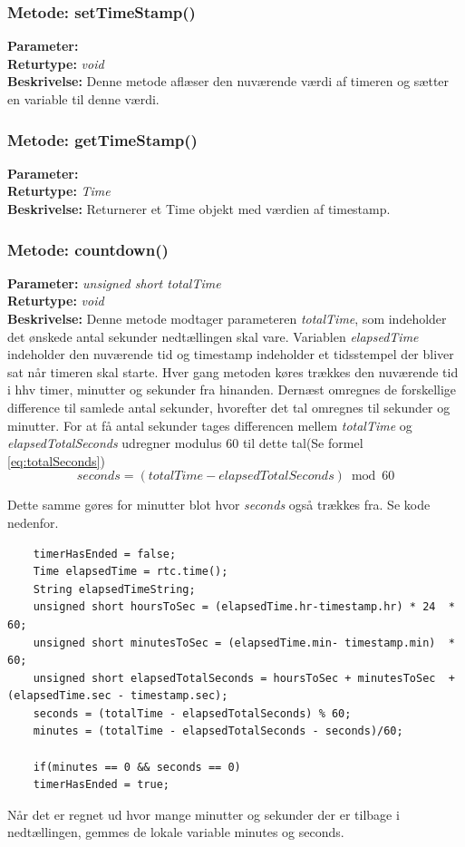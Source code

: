 \subsubsection{Metode: setTimeStamp()}
\textbf{Parameter: } 
\\ \textbf{Returtype: } \textit{void}
\\ \textbf{Beskrivelse: } Denne metode aflæser den nuværende værdi af timeren og sætter en variable til denne værdi. 

\subsubsection{Metode: getTimeStamp()}
\textbf{Parameter: } 
\\ \textbf{Returtype: } \textit{Time}
\\ \textbf{Beskrivelse: } Returnerer et Time objekt med værdien af timestamp. 

\subsubsection{Metode: countdown()}
\textbf{Parameter: } \textit{unsigned short totalTime}
\\ \textbf{Returtype: } \textit{void}
\\ \textbf{Beskrivelse: } Denne metode modtager parameteren \textit{totalTime}, som indeholder det ønskede antal sekunder nedtællingen skal vare. Variablen \textit{elapsedTime} indeholder den nuværende tid og timestamp indeholder et tidsstempel der bliver sat når timeren skal starte. Hver gang metoden køres trækkes den nuværende tid i hhv timer, minutter og sekunder fra hinanden. Dernæst omregnes de forskellige difference til samlede antal sekunder, hvorefter det tal omregnes til sekunder og minutter. For at få antal sekunder tages differencen mellem \textit{totalTime} og \textit{elapsedTotalSeconds} udregner modulus 60 til dette tal(Se formel \ref{eq:totalSeconds})
\begin{equation} \label{eq:totalSeconds}
seconds = (totalTime - elapsedTotalSeconds) \bmod 60
\end{equation}

Dette samme gøres for minutter blot hvor \textit{seconds} også trækkes fra. Se kode nedenfor. 
\begin{lstlisting}
	timerHasEnded = false;
	Time elapsedTime = rtc.time();
	String elapsedTimeString;
	unsigned short hoursToSec = (elapsedTime.hr-timestamp.hr) * 24	* 60;
	unsigned short minutesToSec = (elapsedTime.min- timestamp.min)	* 60;
	unsigned short elapsedTotalSeconds = hoursToSec + minutesToSec	+ (elapsedTime.sec - timestamp.sec);
	seconds = (totalTime - elapsedTotalSeconds) % 60;
	minutes = (totalTime - elapsedTotalSeconds - seconds)/60;
	
	if(minutes == 0 && seconds == 0)
	timerHasEnded = true;
\end{lstlisting}
Når det er regnet ud hvor mange minutter og sekunder der er tilbage i nedtællingen, gemmes de lokale variable minutes og seconds. 

